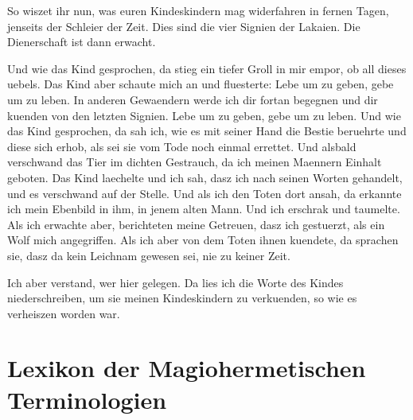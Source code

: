 \documentclass[a5paper,8pt]{book}
\begin{document}
So wiszet ihr nun, was euren Kindeskindern mag widerfahren in fernen Tagen, jenseits der Schleier der Zeit. Dies sind die vier Signien der Lakaien. Die Dienerschaft ist dann erwacht.

Und wie das Kind gesprochen, da stieg ein tiefer Groll in mir empor, ob all dieses uebels. Das Kind aber schaute mich an und fluesterte: Lebe um zu geben, gebe um zu leben. In anderen Gewaendern werde ich dir fortan begegnen und dir kuenden von den letzten Signien. Lebe um zu geben, gebe um zu leben. Und wie das Kind gesprochen, da sah ich, wie es mit seiner Hand die Bestie beruehrte und diese sich erhob, als sei sie vom Tode noch einmal errettet. Und alsbald verschwand das Tier im dichten Gestrauch, da ich meinen Maennern Einhalt geboten. Das Kind laechelte und ich sah, dasz ich nach seinen Worten gehandelt, und es verschwand auf der Stelle. Und als ich den Toten dort ansah, da erkannte ich mein Ebenbild in ihm, in jenem alten Mann. Und ich erschrak und taumelte. Als ich erwachte aber, berichteten meine Getreuen, dasz ich gestuerzt, als ein Wolf mich angegriffen. Als ich aber von dem Toten ihnen kuendete, da sprachen sie, dasz da kein Leichnam gewesen sei, nie zu keiner Zeit.

Ich aber verstand, wer hier gelegen. Da lies ich die Worte des Kindes niederschreiben, um sie meinen Kindeskindern zu verkuenden, so wie es verheiszen worden war.

\chapter{Lexikon der Magiohermetischen Terminologien}
\end{document}
